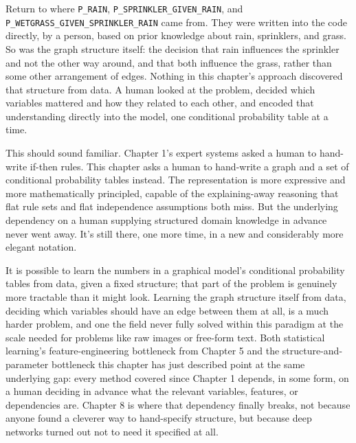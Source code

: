 Return to where \texttt{P\_RAIN}, \texttt{P\_SPRINKLER\_GIVEN\_RAIN}, and \texttt{P\_WETGRASS\_GIVEN\_SPRINKLER\_RAIN} came from. They were written into the code directly, by a person, based on prior knowledge about rain, sprinklers, and grass. So was the graph structure itself: the decision that rain influences the sprinkler and not the other way around, and that both influence the grass, rather than some other arrangement of edges. Nothing in this chapter's approach discovered that structure from data. A human looked at the problem, decided which variables mattered and how they related to each other, and encoded that understanding directly into the model, one conditional probability table at a time.

This should sound familiar. Chapter 1's expert systems asked a human to hand-write if-then rules. This chapter asks a human to hand-write a graph and a set of conditional probability tables instead. The representation is more expressive and more mathematically principled, capable of the explaining-away reasoning that flat rule sets and flat independence assumptions both miss. But the underlying dependency on a human supplying structured domain knowledge in advance never went away. It's still there, one more time, in a new and considerably more elegant notation.

It is possible to learn the numbers in a graphical model's conditional probability tables from data, given a fixed structure; that part of the problem is genuinely more tractable than it might look. Learning the graph structure itself from data, deciding which variables should have an edge between them at all, is a much harder problem, and one the field never fully solved within this paradigm at the scale needed for problems like raw images or free-form text. Both statistical learning's feature-engineering bottleneck from Chapter 5 and the structure-and-parameter bottleneck this chapter has just described point at the same underlying gap: every method covered since Chapter 1 depends, in some form, on a human deciding in advance what the relevant variables, features, or dependencies are. Chapter 8 is where that dependency finally breaks, not because anyone found a cleverer way to hand-specify structure, but because deep networks turned out not to need it specified at all.
